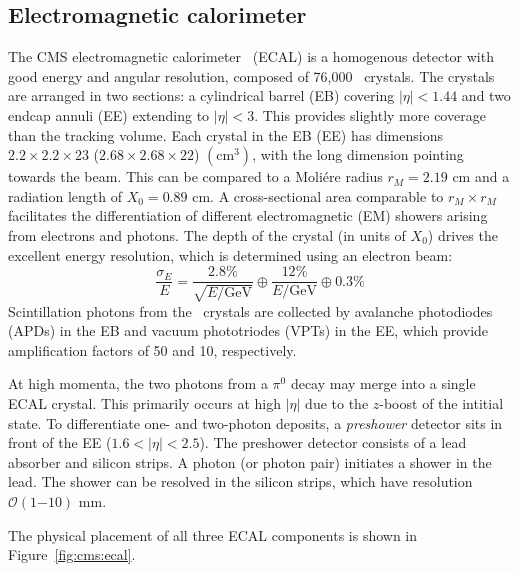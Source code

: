 \subsection{Electromagnetic calorimeter}

The CMS electromagnetic calorimeter~\cite{cmsecaljinst} (ECAL) is a homogenous detector with good energy and angular resolution, composed of 76,000 \pbwo~crystals. 
The crystals are arranged in two sections: a cylindrical barrel (EB) covering $|\eta|<1.44$ and two endcap annuli (EE) extending to $|\eta|<3$.
This provides slightly more coverage than the tracking volume.
Each crystal in the EB (EE) has dimensions $2.2\times2.2\times23$ ($2.68\times2.68\times22$) $(\mathrm{cm}^3)$, with the long dimension pointing towards the beam.
This can be compared to a Moli\'ere radius $r_M=2.19$ cm and a radiation length of $X_0=0.89$ cm. 
A cross-sectional area comparable to $r_M\times r_M$ facilitates the differentiation of different electromagnetic (EM) showers arising from electrons and photons.
The depth of the crystal (in units of $X_0$) drives the excellent energy resolution, which is determined using an electron beam:
\begin{equation}
    \frac{\sigma_E}{E} = \frac{2.8\%}{\sqrt{E/\mathrm{GeV}}} \oplus \frac{12\%}{E/\mathrm{GeV}} \oplus 0.3\%
\end{equation}
Scintillation photons from the \pbwo~crystals are collected by avalanche photodiodes (APDs) in the EB and vacuum phototriodes (VPTs) in the EE, which provide amplification factors of 50 and 10, respectively. 

At high momenta, the two photons from a $\pi^0$ decay may merge into a single ECAL crystal. 
This primarily occurs at high $|\eta|$ due to the $z$-boost of the intitial state.
To differentiate one- and two-photon deposits, a \emph{preshower} detector sits in front of the EE ($1.6 < |\eta|<2.5$).
The preshower detector consists of a lead absorber and silicon strips.
A photon (or photon pair) initiates a shower in the lead.
The shower can be resolved in the silicon strips, which have resolution $\mathcal{O}(1\mathrm{-}10)$ mm.

The physical placement of all three ECAL components is shown in Figure~\ref{fig:cms:ecal}.

